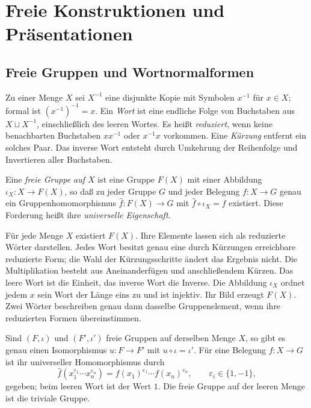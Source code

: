 \chapter{Freie Konstruktionen und Präsentationen}

\section{Freie Gruppen und Wortnormalformen}

\begin{definition}
\label{b40guide:def:group-words}
Zu einer Menge \(X\) sei \(X^{-1}\) eine disjunkte Kopie mit Symbolen
\(x^{-1}\) für \(x\in X\); formal ist \((x^{-1})^{-1}=x\).
Ein \emph{Wort} ist eine endliche Folge von Buchstaben aus
\(X\sqcup X^{-1}\), einschließlich des leeren Wortes.
Es heißt \emph{reduziert}, wenn keine benachbarten Buchstaben
\(xx^{-1}\) oder \(x^{-1}x\) vorkommen.
Eine \emph{Kürzung} entfernt ein solches Paar.
Das inverse Wort entsteht durch Umkehrung der Reihenfolge und
Invertieren aller Buchstaben.
\end{definition}

\begin{definition}
\label{b40guide:def:free-group}
Eine \emph{freie Gruppe auf \(X\)} ist eine Gruppe \(F(X)\) mit einer
Abbildung \(\iota_X:X\to F(X)\), so daß zu jeder Gruppe \(G\) und jeder
Belegung \(f:X\to G\) genau ein Gruppenhomomorphismus
\(\widehat f:F(X)\to G\) mit \(\widehat f\circ\iota_X=f\) existiert.
Diese Forderung heißt ihre \emph{universelle Eigenschaft}.
\end{definition}

\begin{theorem}
\label{b40guide:thm:free-group-normal-form}
Für jede Menge \(X\) existiert \(F(X)\). Ihre Elemente lassen sich
als reduzierte Wörter darstellen. Jedes Wort besitzt genau eine durch
Kürzungen erreichbare reduzierte Form; die Wahl der Kürzungsschritte
ändert das Ergebnis nicht.
Die Multiplikation besteht aus Aneinanderfügen und anschließendem
Kürzen. Das leere Wort ist die Einheit, das inverse Wort die Inverse.
Die Abbildung \(\iota_X\) ordnet jedem \(x\) sein Wort der Länge eins zu
und ist injektiv. Ihr Bild erzeugt \(F(X)\).
Zwei Wörter beschreiben genau dann dasselbe Gruppenelement,
wenn ihre reduzierten Formen übereinstimmen. \cite{milne}
\end{theorem}

\begin{theorem}
\label{b40guide:thm:free-group-universality}
Sind \((F,\iota)\) und \((F',\iota')\) freie Gruppen auf derselben Menge
\(X\), so gibt es genau einen Isomorphismus \(u:F\to F'\) mit
\(u\circ\iota=\iota'\).
Für eine Belegung \(f:X\to G\) ist ihr universeller Homomorphismus durch
\[
 \widehat f(x_1^{\varepsilon_1}\cdots x_n^{\varepsilon_n})
 =f(x_1)^{\varepsilon_1}\cdots f(x_n)^{\varepsilon_n},
 \qquad \varepsilon_i\in\{1,-1\},
\]
gegeben; beim leeren Wort ist der Wert \(1\).
Die freie Gruppe auf der leeren Menge ist die triviale Gruppe.
\cite{milne}
\end{theorem}

